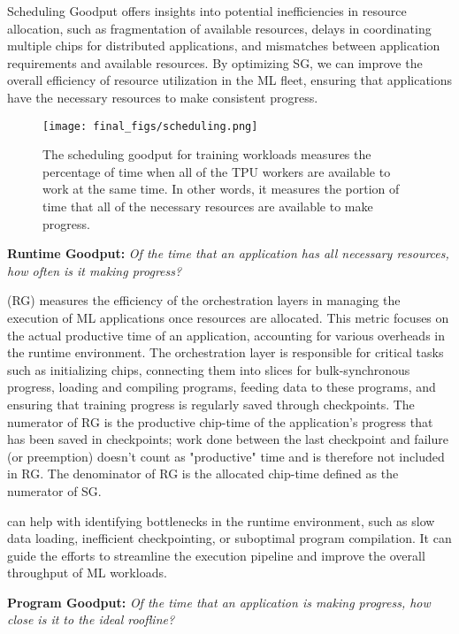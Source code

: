 Scheduling Goodput offers insights into potential inefficiencies in resource allocation, such as fragmentation of available resources, delays in coordinating multiple chips for distributed applications, and mismatches between application requirements and available resources. By optimizing SG, we can improve the overall efficiency of resource utilization in the ML fleet, ensuring that applications have the necessary resources to make consistent progress.

\begin{figure}[t!]
    \centering
    \texttt{[image: final\_figs/scheduling.png]}
    \caption{The scheduling goodput for training workloads measures the percentage of time when all of the TPU workers are available to work at the same time. In other words, it measures the portion of time that all of the necessary resources are available to make progress. 
}
    \label{fig:scheduling}
\end{figure}

\textbf{Runtime Goodput:}
\emph{Of the time that an application has all necessary resources, how often is it making progress?} 

\rg (RG) measures the efficiency of the orchestration layers in managing the execution of ML applications once resources are allocated. This metric focuses on the actual productive time of an application, accounting for various overheads in the runtime environment. The orchestration layer is responsible for critical tasks such as initializing chips, connecting them into slices for bulk-synchronous progress, loading and compiling programs, feeding data to these programs, and ensuring that training progress is regularly saved through checkpoints. The numerator of RG is the productive chip-time of the application's progress that has been saved in checkpoints; work done between the last checkpoint and failure (or preemption) doesn't count as "productive" time and is therefore not included in RG. The denominator of RG is the allocated chip-time defined as the numerator of SG. 

\rg can help with identifying bottlenecks in the runtime environment, such as slow data loading, inefficient checkpointing, or suboptimal program compilation. It can guide the efforts to streamline the execution pipeline and improve the overall throughput of ML workloads.

\textbf{Program Goodput:}
\emph{Of the time that an application is making progress, how close is it to the ideal roofline?}

